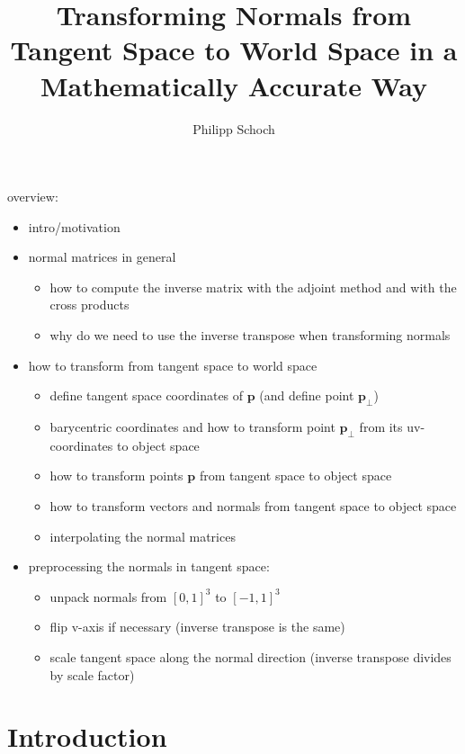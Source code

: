 \documentclass{article}
\newcommand{\point}[1]{\mathbf{#1}}
\begin{document}
overview:
\begin{itemize}
 \item intro/motivation
 \item normal matrices in general
 \begin{itemize}
 \item how to compute the inverse matrix with the adjoint method and with the cross products
 \item why do we need to use the inverse transpose when transforming normals
 \end{itemize}
 \item how to transform from tangent space to world space
 \begin{itemize}
 \item define tangent space coordinates of \(\point{p}\) (and define point \(\point{p_\perp}\))
 \item barycentric coordinates and how to transform point \(\point{p_\perp}\) from its uv-coordinates to object space
 \item how to transform points \(\point{p}\) from tangent space to object space
 \item how to transform vectors and normals from tangent space to object space
 \item interpolating the normal matrices
 \end{itemize}
 \item preprocessing the normals in tangent space: 
 \begin{itemize}
  \item unpack normals from \([0, 1]^3\) to \([-1, 1]^3\)
  \item flip v-axis if necessary (inverse transpose is the same)
  \item scale tangent space along the normal direction (inverse transpose divides by scale factor)
 \end{itemize}

\end{itemize}

\newpage
\title{Transforming Normals from Tangent Space to World Space
in a Mathematically Accurate Way}
\author{Philipp Schoch}
\maketitle
\tableofcontents
\newpage

\section{Introduction}
\end{document}
